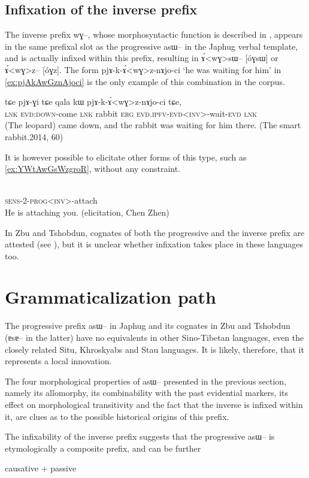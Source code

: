 \documentclass[oldfontcommands,oneside,a4paper,11pt]{article}
\newcommand{\ipa}[1]{{\phon \mbox{#1}}} %
\begin{document}
\subsection{Infixation of the inverse prefix}
The inverse prefix \ipa{wɣ--}, whose morphosyntactic function is described in \citet{jacques10inverse}, appears in the same prefixal slot as the progressive \ipa{asɯ--} in the Japhug verbal template, and is actually infixed within this prefix, resulting in \ipa{ɤ́<wɣ>sɯ--} [\ipa{óɣsɯ}] or \ipa{ɤ́<wɣ>z--} [\ipa{óɣz}]. The form \ipa{pjɤ-k-ɤ́<wɣ>z-nɤjo-ci} `he was waiting for him' in \ref{ex:pjAkAwGznAjoci} is the only example of this combination in the corpus.


\begin{exe}
\ex \label{ex:pjAkAwGznAjoci}
\gll
\ipa{tɕe} 	\ipa{pjɤ-ɣi} 	\ipa{tɕe} 	\ipa{qala} 	\ipa{kɯ} 	\ipa{pjɤ-k-ɤ́<wɣ>z-nɤjo-ci} 	\ipa{tɕe,} \\
\textsc{lnk} \textsc{evd:down}-come \textsc{lnk} rabbit \textsc{erg} \textsc{evd.ipfv-evd<inv>}-wait-\textsc{evd} \textsc{lnk} \\
\glt (The leopard) came down, and the rabbit was waiting for him there. (The smart rabbit.2014, 60)
\end{exe}

It is however possible to elicitate other forms of this type, such as \ref{ex:YWtAwGsWzgroR}, without any constraint.

\begin{exe}
\ex  \label{ex:YWtAwGsWzgroR}
\gll  \ipa{ɲɯ-tɯ-ɤ́<wɣ>sɯ-zgroʁ}    \\
\textsc{sens-2-prog<inv>}-attach \\
\glt He is attaching you. (elicitation, Chen Zhen)
\end{exe}

In Zbu and Tshobdun, cognates of both the progressive and the inverse prefix are attested (see \citealt{jackson02rentongdengdi, gongxun14agreement}), but it is unclear whether infixation takes place in these languages too.
 

\section{Grammaticalization path}
The progressive prefix \ipa{asɯ--} in Japhug and its cognates in Zbu and Tshobdun (\ipa{ɐsɐ--} in the latter) have no equivalents in other Sino-Tibetan languages, even the closely related Situ, Khroskyabs and Stau languages. It is likely, therefore, that it represents a local innovation.

The four morphological properties of \ipa{asɯ--} presented in the previous section, namely its allomorphy, its combinability with the past evidential markers, its effect on morphological transitivity and the fact that the inverse is infixed within it, are clues as to the possible historical origins of this prefix.


The infixability of the inverse prefix suggests that the progressive \ipa{asɯ--} is etymologically a composite prefix, and can be further 


 causative + passive
  


\end{document}

